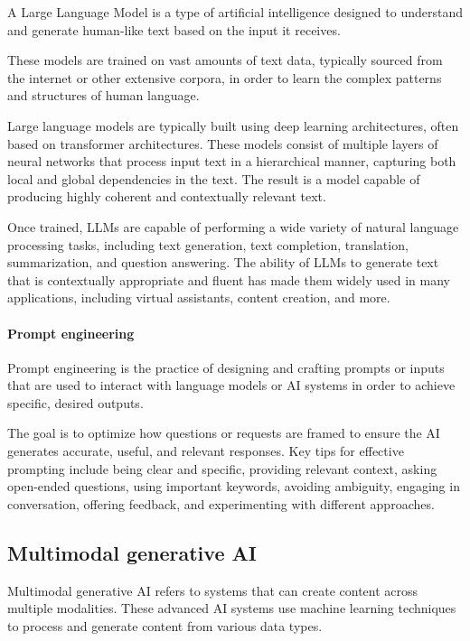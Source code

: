 \begin{definition}
    A Large Language Model is a type of artificial intelligence designed to understand and generate human-like text based on the input it receives.
\end{definition}
\noindent These models are trained on vast amounts of text data, typically sourced from the internet or other extensive corpora, in order to learn the complex patterns and structures of human language.

Large language models are typically built using deep learning architectures, often based on transformer architectures. 
These models consist of multiple layers of neural networks that process input text in a hierarchical manner, capturing both local and global dependencies in the text. 
The result is a model capable of producing highly coherent and contextually relevant text.

Once trained, LLMs are capable of performing a wide variety of natural language processing tasks, including text generation, text completion, translation, summarization, and question answering. 
The ability of LLMs to generate text that is contextually appropriate and fluent has made them widely used in many applications, including virtual assistants, content creation, and more.

\paragraph*{Prompt engineering}
\begin{definition}
    Prompt engineering is the practice of designing and crafting prompts or inputs that are used to interact with language models or AI systems in order to achieve specific, desired outputs. 
\end{definition}
\noindent The goal is to optimize how questions or requests are framed to ensure the AI generates accurate, useful, and relevant responses.
Key tips for effective prompting include being clear and specific, providing relevant context, asking open-ended questions, using important keywords, avoiding ambiguity, engaging in conversation, offering feedback, and experimenting with different approaches.

\subsection{Multimodal generative AI}
Multimodal generative AI refers to systems that can create content across multiple modalities. 
These advanced AI systems use machine learning techniques to process and generate content from various data types.

